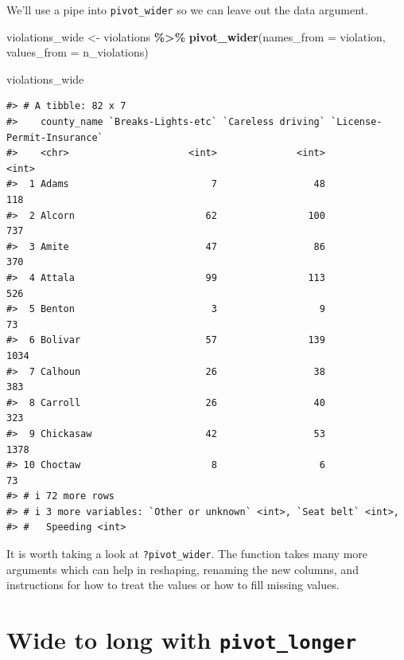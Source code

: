 \documentclass[
]{book}
\newenvironment{Shaded}{\begin{snugshade}}{\end{snugshade}}
\newcommand{\AttributeTok}[1]{\textcolor[rgb]{0.13,0.29,0.53}{#1}}
\newcommand{\FunctionTok}[1]{\textcolor[rgb]{0.13,0.29,0.53}{\textbf{#1}}}
\newcommand{\NormalTok}[1]{#1}
\newcommand{\OtherTok}[1]{\textcolor[rgb]{0.56,0.35,0.01}{#1}}
\newcommand{\SpecialCharTok}[1]{\textcolor[rgb]{0.81,0.36,0.00}{\textbf{#1}}}
\begin{document}
We'll use a pipe into \texttt{pivot\_wider} so we can leave out the data argument.

\begin{Shaded}
\begin{Highlighting}[]
\NormalTok{violations\_wide }\OtherTok{\textless{}{-}}\NormalTok{ violations }\SpecialCharTok{\%\textgreater{}\%}
  \FunctionTok{pivot\_wider}\NormalTok{(}\AttributeTok{names\_from =}\NormalTok{ violation, }
              \AttributeTok{values\_from =}\NormalTok{ n\_violations) }

\NormalTok{violations\_wide}
\end{Highlighting}
\end{Shaded}

\begin{verbatim}
#> # A tibble: 82 x 7
#>    county_name `Breaks-Lights-etc` `Careless driving` `License-Permit-Insurance`
#>    <chr>                     <int>              <int>                      <int>
#>  1 Adams                         7                 48                        118
#>  2 Alcorn                       62                100                        737
#>  3 Amite                        47                 86                        370
#>  4 Attala                       99                113                        526
#>  5 Benton                        3                  9                         73
#>  6 Bolivar                      57                139                       1034
#>  7 Calhoun                      26                 38                        383
#>  8 Carroll                      26                 40                        323
#>  9 Chickasaw                    42                 53                       1378
#> 10 Choctaw                       8                  6                         73
#> # i 72 more rows
#> # i 3 more variables: `Other or unknown` <int>, `Seat belt` <int>,
#> #   Speeding <int>
\end{verbatim}

It is worth taking a look at \texttt{?pivot\_wider}. The function takes many more arguments which can help in reshaping, renaming the new columns, and instructions for how to treat the values or how to fill missing values.

\hypertarget{wide-to-long-with-pivot_longer}{%
\section{\texorpdfstring{Wide to long with \texttt{pivot\_longer}}{Wide to long with pivot\_longer}}\label{wide-to-long-with-pivot_longer}}
\end{document}
